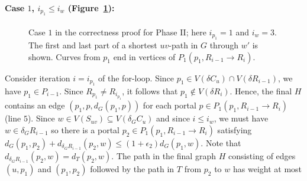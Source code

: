 \documentclass[11pt]{article}
\begin{document}
\paragraph{Case $1$, $i_{p_1}\leq i_w$ (Figure~\ref{fig:Case1}):}\begin{figure}\centerline{}
\caption{Case $1$ in the correctness proof for Phase II; here $i_{p_1} = 1$ and $i_w = 3$. The first and last part of a shortest $uv$-path in $G$ through $w'$ is shown. Curves from $p_1$ end in vertices of $P_1(p_1,R_{i-1}\rightarrow R_i)$.}
\label{fig:Case1}
\end{figure}
Consider iteration $i = i_{p_1}$ of the for-loop. Since $p_1\in V(\delta C_u)\cap V(\delta R_{i-1})$, we have $p_1\in P_{i-1}$. Since $R_{p_1}\neq R_{i_{p_1}}$, it follows that $p_1\notin V(\delta R_i)$. Hence, the final $H$ contains an edge $(p_1,p,d_G(p_1,p))$ for each portal $p\in P_1(p_1,R_{i-1}\rightarrow R_i)$ (line $5$). Since $w\in V(S_{uv})\subseteq V(\delta_G C_u)$ and since $i\leq i_w$, we must have $w\in\delta_G R_{i-1}$ so there is a portal $p_2\in P_1(p_1,R_{i-1}\rightarrow R_i)$ satisfying $d_G(p_1,p_2) + d_{\delta_G R_{i-1}}(p_2,w)\leq (1+\epsilon_2)d_G(p_1,w)$. Note that $d_{\delta_G R_{i-1}}(p_2,w) = d_T(p_2,w)$. The path in the final graph $H$ consisting of edges $(u,p_1)$ and $(p_1,p_2)$ followed by the path in $T$ from $p_2$ to $w$ has weight at most
\end{document}
